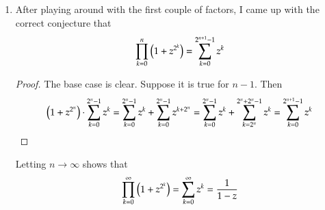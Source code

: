 \documentclass[12pt]{article}
\theoremstyle{definition}
\theoremstyle{remark}
\begin{document}
\begin{enumerate}[leftmargin=\labelsep]
		\item After playing around with the first couple of factors, I came up with the correct conjecture that 
		\begin{align*}
			\prod_{k=0}^n \qty(1+z^{2^k}) = \sum_{k=0}^{2^{n+1}-1} z^k
		\end{align*}
		\begin{proof}
			The base case is clear. Suppose it is true for $n-1$. Then
			\begin{align*}
				\qty(1+z^{2^n}) \cdot \sum_{k=0}^{2^n-1} z^k = \sum_{k=0}^{2^n - 1} z^k + \sum_{k=0}^{2^n-1} z^{k+2^n} = \sum_{k=0}^{2^n - 1} z^k + \sum_{k=2^n}^{2^n + 2^n - 1} z^k = \sum_{k=0}^{2^{n+1} - 1} z^k
			\end{align*}
		\end{proof}
		Letting $n \to \infty$ shows that 
		\begin{align*}
			\prod_{k=0}^\infty \qty(1+z^{2^k}) = \sum_{k=0}^\infty z^k = \frac{1}{1-z}
		\end{align*}
	

\end{enumerate}
\end{document}
